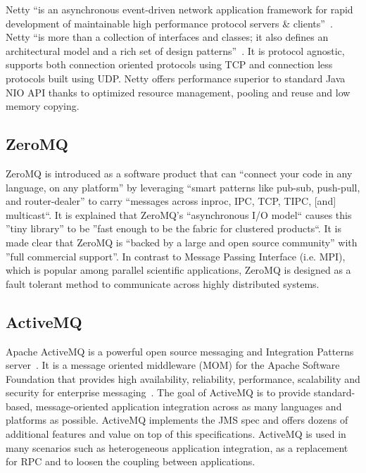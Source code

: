 Netty ``is an asynchronous event-driven network application framework
for rapid development of maintainable high performance protocol
servers \& clients''~\cite{www-netty}. Netty ``is more than a
collection of interfaces and classes; it also defines an architectural
model and a rich set of design patterns''~\cite{netty-book}. It is
protocol agnostic, supports both connection oriented protocols using
TCP and connection less protocols built using UDP. Netty offers
performance superior to standard Java NIO API thanks to optimized
resource management, pooling and reuse and low memory copying.

     \pv
     
\subsection{ZeroMQ}

     ZeroMQ is introduced as a software product
     that can ``connect your code in any language, on any platform'' by 
     leveraging ``smart patterns like pub-sub, push-pull, and 
     router-dealer'' to carry ``messages across inproc, IPC, TCP, TIPC, 
     [and] multicast``\cite{www-zeromq}. It is explained that
     ZeroMQ's ``asynchronous I/O model`` causes this ''tiny library'' to 
     be ''fast enough to be the fabric for clustered products``\cite{www-zeromq2}.
     It is made clear that ZeroMQ is ``backed by a
     large and open source community'' with ''full commercial
     support''\cite{www-zeromq}.
     In contrast to Message Passing Interface (i.e. MPI), which is 
     popular among parallel scientific applications, ZeroMQ is 
     designed as a fault tolerant method to communicate across highly 
     distributed systems.

     \pv

\subsection{ActiveMQ}

Apache ActiveMQ is a powerful open source messaging and Integration
Patterns server~\cite{www-activeMQ}. It is a message oriented
middleware (MOM) for the Apache Software Foundation that provides high
availability, reliability, performance, scalability and security for
enterprise messaging~\cite{ActiveMQ-book}. The goal of ActiveMQ is to
provide standard-based, message-oriented application integration
across as many languages and platforms as possible. ActiveMQ
implements the JMS spec and offers dozens of additional features and
value on top of this specifications. ActiveMQ is used in many
scenarios such as heterogeneous application integration, as a
replacement for RPC and to loosen the coupling between applications.
     
